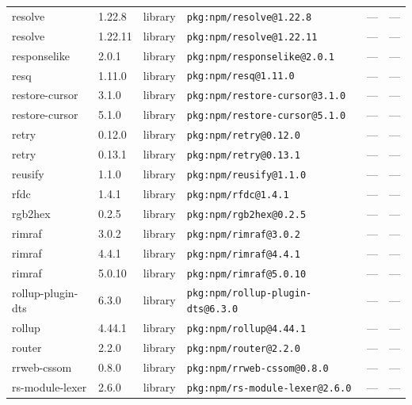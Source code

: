 \documentclass[11pt,a4paper]{article}
\begin{document}
\begin{longtable}{|p{4cm}|p{2cm}|p{1.6cm}|p{5cm}|p{1.5cm}|p{3.5cm}|}
\raggedright resolve & 1.22.8 & library & \small\texttt{pkg:npm/resolve@1.22.8} & — & \small — \\
\raggedright resolve & 1.22.11 & library & \small\texttt{pkg:npm/resolve@1.22.11} & — & \small — \\
\raggedright responselike & 2.0.1 & library & \small\texttt{pkg:npm/responselike@2.0.1} & — & \small — \\
\raggedright resq & 1.11.0 & library & \small\texttt{pkg:npm/resq@1.11.0} & — & \small — \\
\raggedright restore-cursor & 3.1.0 & library & \small\texttt{pkg:npm/restore-cursor@3.1.0} & — & \small — \\
\raggedright restore-cursor & 5.1.0 & library & \small\texttt{pkg:npm/restore-cursor@5.1.0} & — & \small — \\
\raggedright retry & 0.12.0 & library & \small\texttt{pkg:npm/retry@0.12.0} & — & \small — \\
\raggedright retry & 0.13.1 & library & \small\texttt{pkg:npm/retry@0.13.1} & — & \small — \\
\raggedright reusify & 1.1.0 & library & \small\texttt{pkg:npm/reusify@1.1.0} & — & \small — \\
\raggedright rfdc & 1.4.1 & library & \small\texttt{pkg:npm/rfdc@1.4.1} & — & \small — \\
\raggedright rgb2hex & 0.2.5 & library & \small\texttt{pkg:npm/rgb2hex@0.2.5} & — & \small — \\
\raggedright rimraf & 3.0.2 & library & \small\texttt{pkg:npm/rimraf@3.0.2} & — & \small — \\
\raggedright rimraf & 4.4.1 & library & \small\texttt{pkg:npm/rimraf@4.4.1} & — & \small — \\
\raggedright rimraf & 5.0.10 & library & \small\texttt{pkg:npm/rimraf@5.0.10} & — & \small — \\
\raggedright rollup-plugin-dts & 6.3.0 & library & \small\texttt{pkg:npm/rollup-plugin-dts@6.3.0} & — & \small — \\
\raggedright rollup & 4.44.1 & library & \small\texttt{pkg:npm/rollup@4.44.1} & — & \small — \\
\raggedright router & 2.2.0 & library & \small\texttt{pkg:npm/router@2.2.0} & — & \small — \\
\raggedright rrweb-cssom & 0.8.0 & library & \small\texttt{pkg:npm/rrweb-cssom@0.8.0} & — & \small — \\
\raggedright rs-module-lexer & 2.6.0 & library & \small\texttt{pkg:npm/rs-module-lexer@2.6.0} & — & \small — \\

\end{longtable}
\end{document}
